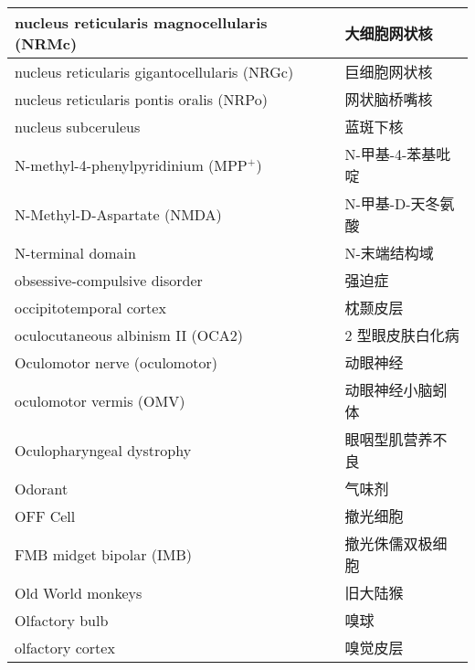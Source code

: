 \begin{longtable}{lll}
	\midrule
	nucleus reticularis magnocellularis (NRMc)   && 大细胞网状核  \\
	
	\midrule
	nucleus reticularis gigantocellularis (NRGc)   && 巨细胞网状核  \\
	
	\midrule
	nucleus reticularis pontis oralis (NRPo)   && 网状脑桥嘴核  \\
	
	\midrule
	nucleus subceruleus   && 蓝斑下核  \\
	
	\midrule
	N-methyl-4-phenylpyridinium (MPP$^+$)  && N-甲基-4-苯基吡啶  \\
	
	\midrule
	N-Methyl-D-Aspartate (NMDA)   && N-甲基-D-天冬氨酸  \\
	
	\midrule
	N-terminal domain   && N-末端结构域  \\
	
	\midrule
	obsessive-compulsive disorder     && 强迫症   \\
	
	\midrule
	occipitotemporal cortex     && 枕颞皮层   \\
	
	\midrule
	oculocutaneous albinism II (OCA2)     && 2 型眼皮肤白化病   \\
	
	\midrule
	Oculomotor nerve (oculomotor)     && 动眼神经   \\
	
	\midrule
	oculomotor vermis (OMV)     && 动眼神经小脑蚓体   \\
	
	\midrule
	Oculopharyngeal dystrophy     && 眼咽型肌营养不良   \\
	
	\midrule
	Odorant     && 气味剂   \\
	
	\midrule
	OFF Cell     && 撤光细胞   \\
	
	\midrule
	FMB midget bipolar (IMB)   && 撤光侏儒双极细胞   \\
	
	\midrule
	Old World monkeys     && 旧大陆猴   \\
	
	\midrule
	Olfactory bulb     && 嗅球   \\
	
	\midrule
	olfactory cortex     && 嗅觉皮层   \\
	

\end{longtable}
